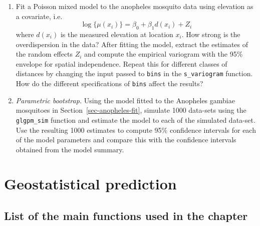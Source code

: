 \documentclass[
  letterpaper,
]{krantz}
\begin{document}
\begin{enumerate}
\[      \] Making use of the R code presented in
  Section~\ref{sec-empirical-variog-bin}, use the function
  \texttt{s\_variogram} to generate the empirical variogram for this
  model and compare this to the empirical variogram of
  Figure~\ref{fig-liberia-variog}. What differences do you observe?
\item
  Fit a Poisson mixed model to the anopheles mosquito data using
  elevation as a covariate, i.e.~\[
      \log\{\mu(x_i)\} = \beta_{0} + \beta_{1} d(x_i) + Z_i
      \] where \(d(x_i)\) is the measured elevation at location \(x_i\).
  How strong is the overdispersion in the data? After fitting the model,
  extract the estimates of the random effects \(Z_i\) and compute the
  empirical variogram with the 95\% envelope for spatial independence.
  Repeat this for different classes of distances by changing the input
  passed to \texttt{bins} in the \texttt{s\_variogram} function. How do
  the different specifications of \texttt{bins} affect the results?
\item
  \emph{Parametric bootstrap.} Using the model fitted to the Anopheles
  gambiae mosquitoes in Section~\ref{sec-anopheles-fit}, simulate 1000
  data-sets using the \texttt{glgpm\_sim} function and estimate the
  model to each of the simulated data-set. Use the resulting 1000
  estimates to compute 95\(\%\) confidence intervals for each of the
  model parameters and compare this with the confidence intervals
  obtained from the model summary.
\end{enumerate}


\chapter{Geostatistical prediction}\label{sec-geo-prediction}

\section*{List of the main functions used in the
chapter}\label{list-of-the-main-functions-used-in-the-chapter-1}

\end{document}
